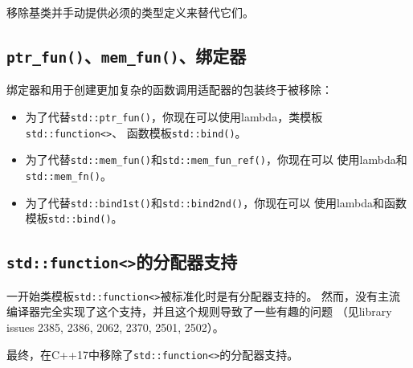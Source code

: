 移除基类并手动提供必须的类型定义来替代它们。

\subsection{\texttt{ptr\_fun()}、\texttt{mem\_fun()}、绑定器}
绑定器和用于创建更加复杂的函数调用适配器的包装终于被移除：
\begin{itemize}
    \item 为了代替\texttt{std::ptr\_fun()}，你现在可以使用lambda，类模板\texttt{std::function<>}、
    函数模板\texttt{std::bind()}。
    \item 为了代替\texttt{std::mem\_fun()}和\texttt{std::mem\_fun\_ref()}，你现在可以
    使用lambda和\texttt{std::mem\_fn()}。
    \item 为了代替\texttt{std::bind1st()}和\texttt{std::bind2nd()}，你现在可以
    使用lambda和函数模板\texttt{std::bind()}。
\end{itemize}

\subsection{\texttt{std::function<>}的分配器支持}
一开始类模板\texttt{std::function<>}被标准化时是有分配器支持的。
然而，没有主流编译器完全实现了这个支持，并且这个规则导致了一些有趣的问题
（见library issues 2385, 2386, 2062, 2370, 2501, 2502）。

最终，在C++17中移除了\texttt{std::function<>}的分配器支持。

